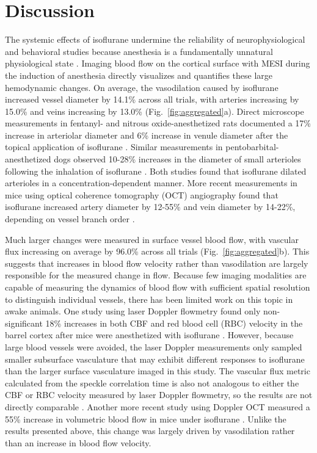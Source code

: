 \documentclass[review]{elsarticle}
\begin{document}
\section{Discussion}

The systemic effects of isoflurane undermine the reliability of neurophysiological and behavioral studies because anesthesia is a fundamentally unnatural physiological state \cite{Gao:2017tw}. Imaging blood flow on the cortical surface with MESI during the induction of anesthesia directly visualizes and quantifies these large hemodynamic changes. On average, the vasodilation caused by isoflurane increased vessel diameter by 14.1\% across all trials, with arteries increasing by 15.0\% and veins increasing by 13.0\% (Fig.~\ref{fig:aggregated}a). Direct microscope measurements in fentanyl- and nitrous oxide-anesthetized rats documented a 17\% increase in arteriolar diameter and 6\% increase in venule diameter after the topical application of isoflurane \cite{Koenig:1994rn}. Similar measurements in pentobarbital-anesthetized dogs observed 10-28\% increases in the diameter of small arterioles following the inhalation of isoflurane \cite{Iida:1998th}. Both studies found that isoflurane dilated arterioles in a concentration-dependent manner. More recent measurements in mice using optical coherence tomography (OCT) angiography found that isoflurane increased artery diameter by 12-55\% and vein diameter by 14-22\%, depending on vessel branch order \cite{Rakymzhan.2021}.

Much larger changes were measured in surface vessel blood flow, with vascular flux increasing on average by 96.0\% across all trials (Fig.~\ref{fig:aggregated}b). This suggests that increases in blood flow velocity rather than vasodilation are largely responsible for the measured change in flow. Because few imaging modalities are capable of measuring the dynamics of blood flow with sufficient spatial resolution to distinguish individual vessels, there has been limited work on this topic in awake animals. One study using laser Doppler flowmetry found only non-significant 18\% increases in both CBF and red blood cell (RBC) velocity in the barrel cortex after mice were anesthetized with isoflurane \cite{Takuwa:2012ee}. However, because large blood vessels were avoided, the laser Doppler measurements only sampled smaller subsurface vasculature that may exhibit different responses to isoflurane than the larger surface vasculature imaged in this study. The vascular flux metric calculated from the speckle correlation time is also not analogous to either the CBF or RBC velocity measured by laser Doppler flowmetry, so the results are not directly comparable \cite{Kazmi:2015du}. Another more recent study using Doppler OCT measured a 55\% increase in volumetric blood flow in mice under isoflurane \cite{Rakymzhan.2021}. Unlike the results presented above, this change was largely driven by vasodilation rather than an increase in blood flow velocity.
\end{document}

